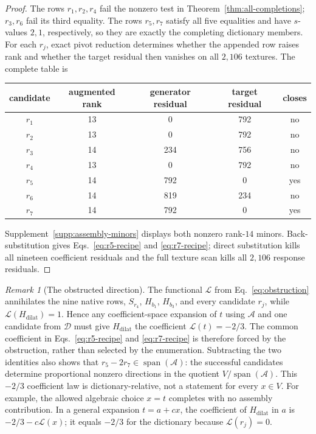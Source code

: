 \documentclass[12pt]{article}
\theoremstyle{definition}
\theoremstyle{remark}
\newtheorem{remark}[theorem]{Remark}
\newcommand{\Span}{\operatorname{span}}
\newcommand{\target}{t}
\begin{document}
\begin{proof}
The rows $r_1,r_2,r_4$ fail the nonzero test in
Theorem~\ref{thm:all-completions}; $r_3,r_6$ fail its third equality.
The rows $r_5,r_7$ satisfy all five equalities and have $s$-values $2,1$,
respectively, so they are exactly the completing dictionary members.
For each $r_j$, exact pivot reduction determines whether the appended row
raises rank and whether the target residual then vanishes on all $2{,}106$
textures.  The complete table is
\begin{center}
\begin{tabular}{@{}ccccc@{}}
\toprule
candidate & augmented rank & generator residual & target residual & closes \\
\midrule
$r_1$ & 13 & 0   & 792 & no \\
$r_2$ & 13 & 0   & 792 & no \\
$r_3$ & 14 & 234 & 756 & no \\
$r_4$ & 13 & 0   & 792 & no \\
$r_5$ & 14 & 792 & 0   & yes \\
$r_6$ & 14 & 819 & 234 & no \\
$r_7$ & 14 & 792 & 0   & yes \\
\bottomrule
\end{tabular}
\end{center}
Supplement~\ref{supp:assembly-minors} displays both nonzero rank-$14$ minors.
Back-substitution gives Eqs.~\eqref{eq:r5-recipe} and \eqref{eq:r7-recipe};
direct substitution kills all nineteen coefficient residuals and the full
texture scan kills all $2{,}106$ response residuals.
\end{proof}

\begin{remark}[The obstructed direction]\label{rem:forced-coefficient}
The functional $\mathcal L$ from Eq.~\eqref{eq:obstruction} annihilates the
nine native rows, $S_{r_4}$, $H_{b_1}$, $H_{b_3}$, and every candidate
$r_j$, while $\mathcal L(H_{\mathrm{dilat}})=1$.  Hence any coefficient-space
expansion of $\target$ using $\mathcal A$ and one candidate from $\mathcal D$
must give
$H_{\mathrm{dilat}}$ the coefficient
$\mathcal L(\target)=-2/3$.  The common coefficient in
Eqs.~\eqref{eq:r5-recipe} and \eqref{eq:r7-recipe} is therefore forced by the
obstruction, rather than selected by the enumeration.  Subtracting the two
identities also shows that $r_5-2r_7\in\Span(\mathcal A)$: the successful
candidates determine proportional nonzero directions in the quotient
$V/\Span(\mathcal A)$.
This $-2/3$ coefficient law is dictionary-relative, not a statement for every
$x\in V$.  For example, the allowed algebraic choice $x=\target$ completes
with no assembly contribution.  In a general expansion $\target=a+cx$, the
coefficient of $H_{\mathrm{dilat}}$ in $a$ is
$-2/3-c\mathcal L(x)$; it equals $-2/3$ for the dictionary because
$\mathcal L(r_j)=0$.
\end{remark}
\end{document}
